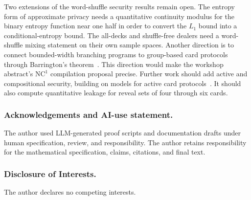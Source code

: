 \documentclass[runningheads]{llncs}
\begin{document}
Two extensions of the word-shuffle security results remain open. The entropy form of approximate privacy needs a quantitative continuity
modulus for the binary entropy function near one half in order to
convert the $L_1$ bound into a conditional-entropy bound. The all-decks and shuffle-free
dealers need a word-shuffle mixing statement on their own sample spaces. Another
direction is to connect
bounded-width branching programs to group-based card protocols through
Barrington's theorem~\cite{Barrington1989,DvorakKoucky2021}. This direction
would make the workshop abstract's $\mathrm{NC}^1$ compilation proposal
precise. Further work should add active and compositional security, building
on models for active card protocols~\cite{KochFUN2021}. It should also
compute quantitative leakage for reveal sets of four through six cards.

\subsubsection*{Acknowledgements and AI-use statement.}

The author used LLM-generated proof scripts and documentation drafts under
human specification, review, and responsibility. The author retains
responsibility for the mathematical specification, claims, citations, and
final text.

\subsubsection*{Disclosure of Interests.}

The author declares no competing interests.



\end{document}

